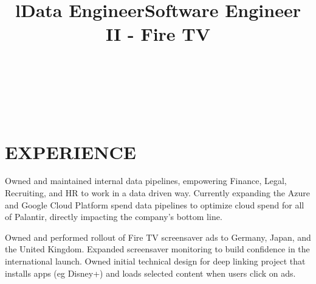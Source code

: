 \documentclass[margin]{res}
\begin{document}
\begin{resume}

\begin{format}
\title{l}\\
\\
\body\\
\end{format}

\section{EXPERIENCE}

\title{\textbf{Data Engineer}}
\begin{position}
Owned and maintained internal data pipelines, empowering Finance, Legal, Recruiting, and HR to work in a data driven way. Currently expanding the Azure and Google Cloud Platform spend data pipelines to optimize cloud spend for all of Palantir, directly impacting the company's bottom line. 
\end{position}

\title{\textbf{Software Engineer II - Fire TV}}
\begin{position}
Owned and performed rollout of Fire TV screensaver ads to Germany, Japan, and the United Kingdom. Expanded screensaver monitoring to build confidence in the international launch. Owned initial technical design for deep linking project that installs apps (eg Disney+) and loads selected content when users click on ads. 
\end{position}


\end{resume}
\end{document}
